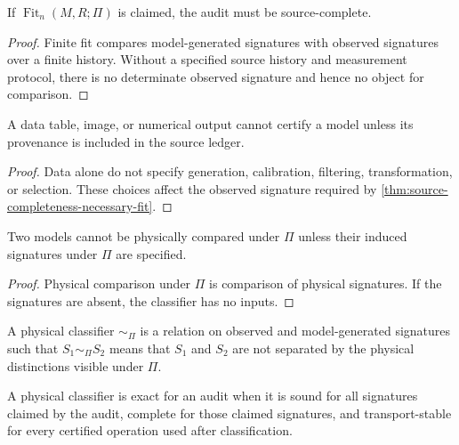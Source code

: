 \begin{theorem}
\label{thm:source-completeness-necessary-fit}
If $\operatorname{Fit}_n(M,R;\Pi)$ is claimed, the audit must be source-complete.
\end{theorem}

\begin{proof}
Finite fit compares model-generated signatures with observed signatures over a finite history. Without a specified source history and measurement protocol, there is no determinate observed signature and hence no object for comparison.
\end{proof}

\begin{corollary}
\label{cor:data-without-provenance-cannot-certify}
A data table, image, or numerical output cannot certify a model unless its provenance is included in the source ledger.
\end{corollary}

\begin{proof}
Data alone do not specify generation, calibration, filtering, transformation, or selection. These choices affect the observed signature required by \autoref{thm:source-completeness-necessary-fit}.
\end{proof}

\begin{theorem}
\label{thm:signature-completeness-necessary-comparison}
Two models cannot be physically compared under $\Pi$ unless their induced signatures under $\Pi$ are specified.
\end{theorem}

\begin{proof}
Physical comparison under $\Pi$ is comparison of physical signatures. If the signatures are absent, the classifier has no inputs.
\end{proof}

\begin{definition}
\label{def:physical-classifier-audit}
A physical classifier $\sim_{\Pi}$ is a relation on observed and model-generated signatures such that $S_1\sim_{\Pi}S_2$ means that $S_1$ and $S_2$ are not separated by the physical distinctions visible under $\Pi$.
\end{definition}

\begin{definition}
\label{def:classifier-exactness}
A physical classifier is exact for an audit when it is sound for all signatures claimed by the audit, complete for those claimed signatures, and transport-stable for every certified operation used after classification.
\end{definition}


